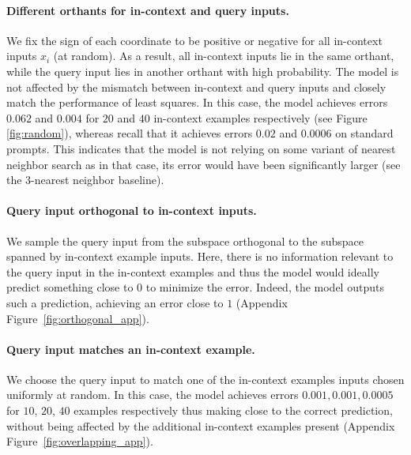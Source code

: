 \paragraph{Different orthants for in-context  and query inputs.} We fix the sign of each coordinate to be positive or negative for all in-context inputs $x_i$ (at random). 
As a result, all in-context inputs lie in the same orthant, while the query input lies in another orthant with high probability.
The model is not affected by the mismatch between in-context and query inputs and closely match the performance of least squares.
In this case, the model achieves errors $0.062$ and $0.004$ for $20$ and $40$ in-context examples respectively (see Figure \ref{fig:random}), whereas recall that it achieves errors $0.02$ and $0.0006$ on standard prompts. 
This indicates that the model is not relying on some variant of nearest neighbor search as in that case, its error would have been significantly larger (see the 3-nearest neighbor baseline).

\paragraph{Query input orthogonal to in-context inputs.} We sample the query input from the subspace orthogonal to the subspace spanned by in-context example inputs.
Here, there is no information relevant to the query input in the in-context examples and thus the model would ideally predict something close to 0 to minimize the error.
Indeed, the model outputs such a prediction, achieving an error close to $1$ (Appendix Figure~\ref{fig:orthogonal_app}).

\paragraph{Query input matches an in-context example.}
We choose the query input to match one of the in-context examples inputs chosen uniformly at random.
In this case, the model achieves errors $0.001, 0.001, 0.0005$ for $10$, $20$, $40$ examples respectively thus making close to the correct prediction, without being affected by the additional in-context examples present (Appendix Figure~\ref{fig:overlapping_app}).
